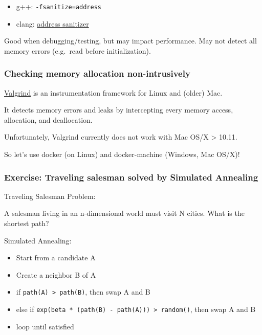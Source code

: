 \begin{itemize}
\itemsep1pt\parskip0pt
\item
  g++: \texttt{-fsanitize=address}
\item
  clang:
  \href{https://clang.llvm.org/docs/AddressSanitizer.html}{address
  sanitizer}
\end{itemize}

Good when debugging/testing, but may impact performance. May not detect
all memory errors (e.g.~read before initialization).

\subsubsection{Checking memory allocation
non-intrusively}\label{checking-memory-allocation-non-intrusively}

\href{http://valgrind.org/}{Valgrind} is an instrumentation framework
for Linux and (older) Mac.

It detects memory errors and leaks by intercepting every memory access,
allocation, and deallocation.

Unfortunately, Valgrind currently does not work with Mac OS/X
\textgreater{} 10.11.

So let's use docker (on Linux) and docker-machine (Windows, Mac OS/X)!

\subsubsection{Exercise: Traveling salesman solved by Simulated
Annealing}\label{exercise-traveling-salesman-solved-by-simulated-annealing}

Traveling Salesman Problem:

A salesman living in an n-dimensional world must visit N cities. What is
the shortest path?

Simulated Annealing:

\begin{itemize}
\itemsep1pt\parskip0pt
\item
  Start from a candidate A
\item
  Create a neighbor B of A
\item
  if \texttt{path(A) \textgreater{} path(B)}, then swap A and B
\item
  else if
  \texttt{exp(beta * (path(B) - path(A))) \textgreater{} random()}, then
  swap A and B
\item
  loop until satisfied
\end{itemize}

